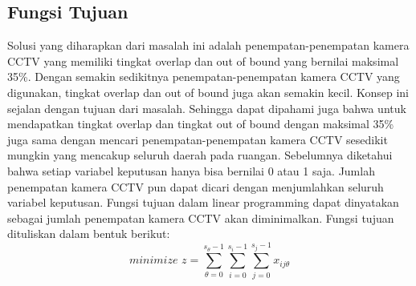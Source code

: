 \subsection{Fungsi Tujuan}
Solusi yang diharapkan dari masalah ini adalah penempatan-penempatan kamera CCTV yang memiliki tingkat overlap dan out of bound yang bernilai maksimal 35\%. Dengan semakin sedikitnya penempatan-penempatan kamera CCTV yang digunakan, tingkat overlap dan out of bound juga akan semakin kecil. Konsep ini sejalan dengan tujuan dari masalah. Sehingga dapat dipahami juga bahwa untuk mendapatkan tingkat overlap dan tingkat out of bound dengan maksimal 35\% juga sama dengan mencari penempatan-penempatan kamera CCTV sesedikit mungkin yang mencakup seluruh daerah pada ruangan. Sebelumnya diketahui bahwa setiap variabel keputusan hanya bisa bernilai 0 atau 1 saja. Jumlah penempatan kamera CCTV pun dapat dicari dengan menjumlahkan seluruh variabel keputusan. Fungsi tujuan dalam linear programming dapat dinyatakan sebagai jumlah penempatan kamera CCTV akan diminimalkan. Fungsi tujuan dituliskan dalam bentuk berikut:
\begin{equation*}
	\textit{minimize }z = \sum_{\theta=0}^{s_{\theta}-1} \sum_{i=0}^{s_i-1} \sum_{j=0}^{s_j-1} x_{ij\theta}
\end{equation*}

